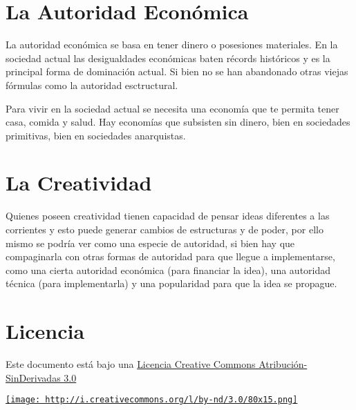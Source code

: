 \documentclass[11pt]{article}
\begin{document}
\section{La Autoridad Económica}
\label{sec-6}

La autoridad económica se basa en tener dinero o posesiones
materiales. En la sociedad actual las desigualdades económicas baten
récords históricos y es la principal forma de dominación actual. Si
bien no se han abandonado otras viejas fórmulas como la autoridad
esctructural.

Para vivir en la sociedad actual se necesita una economía que te
permita tener casa, comida y salud. Hay economías que subsisten sin
dinero, bien en sociedades primitivas, bien en sociedades anarquistas.
\section{La Creatividad}
\label{sec-7}

Quienes poseen creatividad tienen capacidad de pensar ideas diferentes
a las corrientes y esto puede generar cambios de estructuras y de
poder, por ello mismo se podría ver como una especie de autoridad, si
bien hay que compaginarla con otras formas de autoridad para que
llegue a implementarse, como una cierta autoridad económica (para
financiar la idea), una autoridad técnica (para implementarla) y una
popularidad para que la idea se propague.
\section{Licencia}
\label{sec-8}

Este documento está bajo una \href{http://creativecommons.org/licenses/by-nd/3.0/es/deed}{Licencia Creative Commons Atribución-SinDerivadas 3.0}

\href{http://creativecommons.org/licenses/by-nd/3.0/es/deed}{\texttt{[image: http://i.creativecommons.org/l/by-nd/3.0/80x15.png]}}
\end{document}
